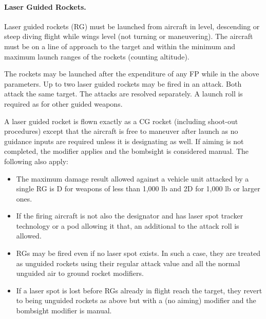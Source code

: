 \paragraph{Laser Guided Rockets.} Laser guided rockets (RG) must be launched from aircraft in level, descending or steep diving flight while wings level (not turning or maneuvering). The aircraft must be on a line of approach to the target and within the minimum and maximum launch ranges of the rockets (counting altitude).

The rockets may be launched after the expenditure of any FP while in the above parameters. Up to two laser guided rockets may be fired in an attack. Both attack the same target. The attacks are resolved separately. A launch roll is required as for other guided weapons.

A laser guided rocket is flown exactly as a CG rocket (including shoot-out procedures) except that the aircraft is free to maneuver after launch as no guidance inputs are required unless it is designating as well. If aiming is not completed, the  modifier applies and the bombsight is considered manual. The following also apply:

\begin{itemize}

    \item The maximum damage result allowed against a vehicle unit attacked by a single RG is D for weapons of less than 1,000 lb and 2D for 1,000 lb or larger ones.

    \item If the firing aircraft is not also the designator and has laser spot tracker technology or a pod allowing it that, an additional  to the attack roll is allowed.

    \item RGs may be fired even if no laser spot exists. In such a case, they are treated as unguided rockets using their regular attack value and all the normal unguided air to ground rocket modifiers.

    \item If a laser spot is lost before RGs already in flight reach the target, they revert to being unguided rockets as above but with a  (no aiming) modifier and the bombsight modifier is manual.

\end{itemize}
